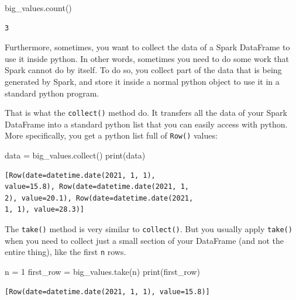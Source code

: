 \documentclass[
  11pt,
  letterpaper,
  DIV=11,
  numbers=noendperiod]{scrreprt}
\newenvironment{Shaded}{\begin{snugshade}}{\end{snugshade}}
\newcommand{\BuiltInTok}[1]{\textcolor[rgb]{0.00,0.23,0.31}{#1}}
\newcommand{\DecValTok}[1]{\textcolor[rgb]{0.68,0.00,0.00}{#1}}
\newcommand{\NormalTok}[1]{\textcolor[rgb]{0.00,0.23,0.31}{#1}}
\newcommand{\OperatorTok}[1]{\textcolor[rgb]{0.37,0.37,0.37}{#1}}
\begin{document}
\begin{Shaded}
\begin{Highlighting}[]
\NormalTok{big\_values.count()}
\end{Highlighting}
\end{Shaded}

\begin{verbatim}
3
\end{verbatim}

Furthermore, sometimes, you want to collect the data of a Spark
DataFrame to use it inside python. In other words, sometimes you need to
do some work that Spark cannot do by itself. To do so, you collect part
of the data that is being generated by Spark, and store it inside a
normal python object to use it in a standard python program.

That is what the \texttt{collect()} method do. It transfers all the data
of your Spark DataFrame into a standard python list that you can easily
access with python. More specifically, you get a python list full of
\texttt{Row()} values:

\begin{Shaded}
\begin{Highlighting}[]
\NormalTok{data }\OperatorTok{=}\NormalTok{ big\_values.collect()}
\BuiltInTok{print}\NormalTok{(data)}
\end{Highlighting}
\end{Shaded}

\begin{verbatim}
[Row(date=datetime.date(2021, 1, 1),
value=15.8), Row(date=datetime.date(2021, 1,
2), value=20.1), Row(date=datetime.date(2021,
1, 1), value=28.3)]
\end{verbatim}

The \texttt{take()} method is very similar to \texttt{collect()}. But
you usually apply \texttt{take()} when you need to collect just a small
section of your DataFrame (and not the entire thing), like the first
\texttt{n} rows.

\begin{Shaded}
\begin{Highlighting}[]
\NormalTok{n }\OperatorTok{=} \DecValTok{1}
\NormalTok{first\_row }\OperatorTok{=}\NormalTok{ big\_values.take(n)}
\BuiltInTok{print}\NormalTok{(first\_row)}
\end{Highlighting}
\end{Shaded}

\begin{verbatim}
[Row(date=datetime.date(2021, 1, 1), value=15.8)]
\end{verbatim}
\end{document}
